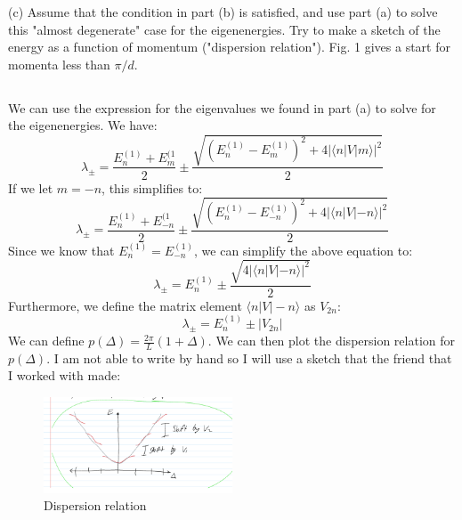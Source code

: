 \documentclass[12pt]{article}
\begin{document}
(c) Assume that the condition in part (b) is satisfied, and use part (a) to solve this "almost degenerate" case for the eigenenergies. Try to make a sketch of the energy as a function of momentum ("dispersion relation"). Fig. 1 gives a start for momenta less than $\pi / d$.
\subsection{}
We can use the expression for the eigenvalues we found in part (a) to solve for the eigenenergies. We have:
\begin{equation}
  \lambda_{\pm} = \frac{E_{n}^{(1)} + E_{m}^{(1}}{2} \pm \frac{\sqrt{(E_{n}^{(1)} - E_{m}^{(1)})^2 + 4|\langle n|V| m\rangle|^2}}{2}
\end{equation}
If we let $m=-n$, this simplifies to:
\begin{equation}
  \lambda_{\pm} = \frac{E_{n}^{(1)} + E_{-n}^{(1}}{2} \pm \frac{\sqrt{(E_{n}^{(1)} - E_{-n}^{(1)})^2 + 4|\langle n|V| -n\rangle|^2}}{2}
\end{equation}
Since we know that $E_{n}^{(1)}=E_{-n}^{(1)}$, we can simplify the above equation to:
\begin{equation}
  \lambda_{\pm} = E_{n}^{(1)} \pm \frac{\sqrt{4|\langle n|V| -n\rangle|^2}}{2}
\end{equation}
Furthermore, we define the matrix element $\langle n|V| -n\rangle$ as $V_{2n}$:
\begin{equation}
  \lambda_{\pm} = E_{n}^{(1)} \pm |V_{2n}|
\end{equation}
We can define $p(\Delta )= \frac{2\pi}{L}(1+\Delta )$. We can then plot the dispersion relation for $p(\Delta )$. I am not able to write by hand so I will use a sketch that the friend that I worked with made:
\begin{figure}
  \centering
  \includegraphics[width=0.5\textwidth]{dr.png}
  \caption{Dispersion relation}
\end{figure}
\end{document}
